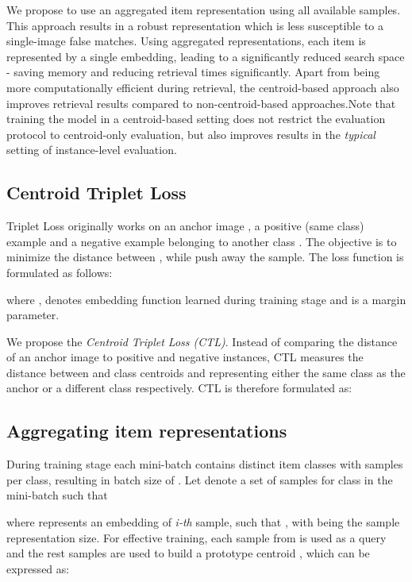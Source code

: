 \documentclass[sigconf,nonacm]{acmart}
\begin{document}
We propose to use an aggregated item representation using all available samples. This approach results in a robust representation which is less susceptible to a single-image false matches. Using aggregated representations, each item is represented by a single embedding, leading to a significantly reduced search space - saving memory and reducing retrieval times significantly.
Apart from being more computationally efficient during retrieval, the centroid-based approach also improves retrieval results compared to non-centroid-based approaches.Note that training the model in a centroid-based setting does not restrict the evaluation protocol to centroid-only evaluation, but also improves results in the \textit{typical} setting of instance-level evaluation.

\subsection{Centroid Triplet Loss}

Triplet Loss originally works on an anchor image , a positive (same class) example  and a negative example belonging to another class . The objective is to minimize the distance between , while push away the  sample. The loss function is formulated as follows:

where ,  denotes embedding function learned during training stage and  is a margin parameter.

We propose the \textit{Centroid Triplet Loss (CTL)}. Instead of comparing the distance of an anchor image  to positive and negative instances, CTL measures the distance between  and class centroids  and  representing either the same class as the anchor or a different class respectively.
CTL is therefore formulated as:


\subsection{Aggregating item representations}

During training stage each mini-batch contains  distinct item classes with  samples per class, resulting in batch size of .
Let  denote a set of samples for class  in the mini-batch such that 
 
where  represents an embedding of \emph{i-th} sample, such that , with  being the sample representation size.
For effective training, each sample from  is used as a query   and the rest  samples are used to build a prototype centroid , which can be expressed as:
\end{document}
